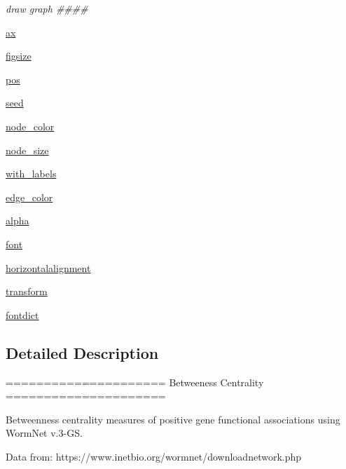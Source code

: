 \begin{DoxyCompactItemize}
\begin{DoxyCompactList}\small\item\em draw graph \#\#\#\# \end{DoxyCompactList}\item 
\hyperlink{namespaceplot__betweenness__centrality_ad873d5fea30a9fc180f0509bd7671bce}{ax}
\item 
\hyperlink{namespaceplot__betweenness__centrality_a7c50f03432bec65cad40ad411aceab04}{figsize}
\item 
\hyperlink{namespaceplot__betweenness__centrality_aca35f01d99a8634cc0ad8ca4d62bd824}{pos}
\item 
\hyperlink{namespaceplot__betweenness__centrality_a1c93bf942c76dbb44ddd7f208074a5fa}{seed}
\item 
\hyperlink{namespaceplot__betweenness__centrality_adc298781811b590283dd0ef2e8be936a}{node\+\_\+color}
\item 
\hyperlink{namespaceplot__betweenness__centrality_a030264658ae0e0871f321a6c67f4dc68}{node\+\_\+size}
\item 
\hyperlink{namespaceplot__betweenness__centrality_a8ce145ebe1ed117332bea157693e949a}{with\+\_\+labels}
\item 
\hyperlink{namespaceplot__betweenness__centrality_a1f875104df53c017f8c4217adb6dd8a3}{edge\+\_\+color}
\item 
\hyperlink{namespaceplot__betweenness__centrality_ad4b40e540eed7a8a4c0673ad2483fec8}{alpha}
\item 
\hyperlink{namespaceplot__betweenness__centrality_a4c0ca12a72e21af2703631dfd84402db}{font}
\item 
\hyperlink{namespaceplot__betweenness__centrality_a1b5d3d1b44533d96a0e24b447a47b546}{horizontalalignment}
\item 
\hyperlink{namespaceplot__betweenness__centrality_af7c7637b8ad7a9d0817d4a29d5cb5505}{transform}
\item 
\hyperlink{namespaceplot__betweenness__centrality_a95b59373274fe542b9910fc482d5990b}{fontdict}
\end{DoxyCompactItemize}


\subsection{Detailed Description}
\begin{DoxyVerb}=====================
Betweeness Centrality
=====================

Betweenness centrality measures of positive gene functional associations
using WormNet v.3-GS.

Data from: https://www.inetbio.org/wormnet/downloadnetwork.php
\end{DoxyVerb}
 


